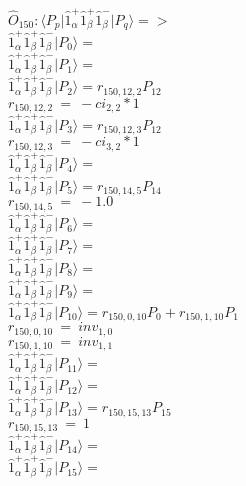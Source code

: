 \documentclass[14pt]{article}
\begin{document}
    $\hat{O}_{150}:  \langle{P_p}\vert \hat{1}_{\alpha}^{+}\hat{1}_{\beta}^{+}\hat{1}_{\beta}^{-} \vert{P_q}\rangle => $ \\ 
    $ \hat{1}_{\alpha}^{+}\hat{1}_{\beta}^{+}\hat{1}_{\beta}^{-} \vert{P_{0}}\rangle =  $ \\ 
    $ \hat{1}_{\alpha}^{+}\hat{1}_{\beta}^{+}\hat{1}_{\beta}^{-} \vert{P_{1}}\rangle =  $ \\ 
    $ \hat{1}_{\alpha}^{+}\hat{1}_{\beta}^{+}\hat{1}_{\beta}^{-} \vert{P_{2}}\rangle = {r}_{150,12,2}P_{12} $ \\ 
    ${r}_{150,12,2}\ =\ -{ci}_{2,2}*1 $ \\ 
    $ \hat{1}_{\alpha}^{+}\hat{1}_{\beta}^{+}\hat{1}_{\beta}^{-} \vert{P_{3}}\rangle = {r}_{150,12,3}P_{12} $ \\ 
    ${r}_{150,12,3}\ =\ -{ci}_{3,2}*1 $ \\ 
    $ \hat{1}_{\alpha}^{+}\hat{1}_{\beta}^{+}\hat{1}_{\beta}^{-} \vert{P_{4}}\rangle =  $ \\ 
    $ \hat{1}_{\alpha}^{+}\hat{1}_{\beta}^{+}\hat{1}_{\beta}^{-} \vert{P_{5}}\rangle = {r}_{150,14,5}P_{14} $ \\ 
    ${r}_{150,14,5}\ =\ -1.0 $ \\ 
    $ \hat{1}_{\alpha}^{+}\hat{1}_{\beta}^{+}\hat{1}_{\beta}^{-} \vert{P_{6}}\rangle =  $ \\ 
    $ \hat{1}_{\alpha}^{+}\hat{1}_{\beta}^{+}\hat{1}_{\beta}^{-} \vert{P_{7}}\rangle =  $ \\ 
    $ \hat{1}_{\alpha}^{+}\hat{1}_{\beta}^{+}\hat{1}_{\beta}^{-} \vert{P_{8}}\rangle =  $ \\ 
    $ \hat{1}_{\alpha}^{+}\hat{1}_{\beta}^{+}\hat{1}_{\beta}^{-} \vert{P_{9}}\rangle =  $ \\ 
    $ \hat{1}_{\alpha}^{+}\hat{1}_{\beta}^{+}\hat{1}_{\beta}^{-} \vert{P_{10}}\rangle = {r}_{150,0,10}P_{0}+{r}_{150,1,10}P_{1} $ \\ 
    ${r}_{150,0,10}\ =\ {inv}_{1,0} $ \\ 
    ${r}_{150,1,10}\ =\ {inv}_{1,1} $ \\ 
    $ \hat{1}_{\alpha}^{+}\hat{1}_{\beta}^{+}\hat{1}_{\beta}^{-} \vert{P_{11}}\rangle =  $ \\ 
    $ \hat{1}_{\alpha}^{+}\hat{1}_{\beta}^{+}\hat{1}_{\beta}^{-} \vert{P_{12}}\rangle =  $ \\ 
    $ \hat{1}_{\alpha}^{+}\hat{1}_{\beta}^{+}\hat{1}_{\beta}^{-} \vert{P_{13}}\rangle = {r}_{150,15,13}P_{15} $ \\ 
    ${r}_{150,15,13}\ =\ 1 $ \\ 
    $ \hat{1}_{\alpha}^{+}\hat{1}_{\beta}^{+}\hat{1}_{\beta}^{-} \vert{P_{14}}\rangle =  $ \\ 
    $ \hat{1}_{\alpha}^{+}\hat{1}_{\beta}^{+}\hat{1}_{\beta}^{-} \vert{P_{15}}\rangle =  $ \\ 
    
\end{document}
